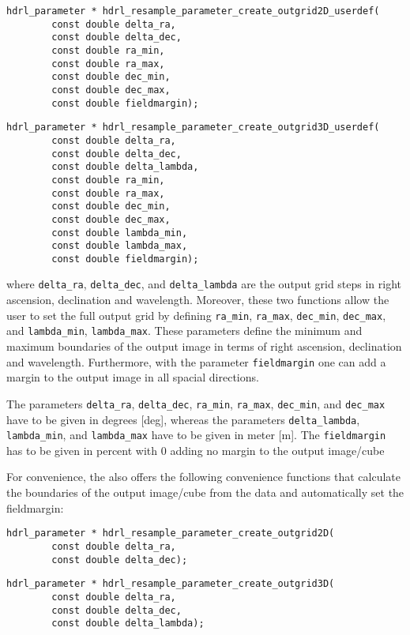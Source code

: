 \begin{lstlisting}
hdrl_parameter * hdrl_resample_parameter_create_outgrid2D_userdef(
        const double delta_ra,
        const double delta_dec,
        const double ra_min,
        const double ra_max,
        const double dec_min,
        const double dec_max,
        const double fieldmargin);  
\end{lstlisting}

\begin{lstlisting}
hdrl_parameter * hdrl_resample_parameter_create_outgrid3D_userdef(
        const double delta_ra,
        const double delta_dec,
        const double delta_lambda,
        const double ra_min,
        const double ra_max,
        const double dec_min,
        const double dec_max,
        const double lambda_min,
        const double lambda_max,
        const double fieldmargin);
\end{lstlisting}

where \verb+delta_ra+, \verb+delta_dec+, and \verb+delta_lambda+ are the output
grid steps in right ascension, declination and wavelength. Moreover, these two
functions allow the user to set the full output grid by defining
\verb+ra_min+, \verb+ra_max+,  \verb+dec_min+, \verb+dec_max+, and
\verb+lambda_min+, \verb+lambda_max+. These parameters define the minimum and
maximum boundaries of the output image in terms of right ascension, declination
and wavelength. Furthermore, with the parameter \verb+fieldmargin+ one can add a
margin to the output image in all spacial directions.

The parameters \verb+delta_ra+, \verb+delta_dec+, \verb+ra_min+, \verb+ra_max+,
\verb+dec_min+, and \verb+dec_max+ have to be given in degrees [deg], whereas the
parameters \verb+delta_lambda+, \verb+lambda_min+, and \verb+lambda_max+ have to
be given in meter [m]. The \verb+fieldmargin+ has to be given in percent with 0
adding no margin to the output image/cube

For convenience, the \HDRL also offers the following convenience functions that
calculate the boundaries of the output image/cube from the data and
automatically set the fieldmargin:


\begin{lstlisting}
hdrl_parameter * hdrl_resample_parameter_create_outgrid2D(
        const double delta_ra,
        const double delta_dec);  
\end{lstlisting}

\begin{lstlisting}
hdrl_parameter * hdrl_resample_parameter_create_outgrid3D(
        const double delta_ra,
        const double delta_dec,
        const double delta_lambda);  
\end{lstlisting}

